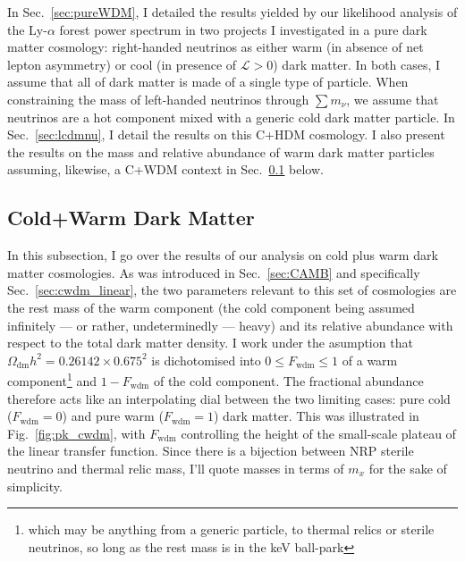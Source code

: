 \vspace*{1.5pc}

In Sec.~\ref{sec:pureWDM}, I detailed the results yielded by our likelihood analysis of the Ly-$\alpha$ forest power spectrum in two projects I investigated in a pure dark matter cosmology: right-handed neutrinos as either warm (in absence of net lepton asymmetry) or cool (in presence of $\mathcal{L}>0$) dark matter. In both cases, I assume that all of dark matter is made of a single type of particle. When constraining the mass of left-handed neutrinos through $\sum m_\nu$, we assume that neutrinos are a hot component mixed with a generic cold dark matter particle. In Sec.~\ref{sec:lcdmnu}, I detail the results on this C+HDM cosmology. I also present the results on the mass and relative abundance of warm dark matter particles assuming, likewise, a C+WDM context in Sec.~\ref{sec:cwdm_flux} below. \\

\subsection{Cold+Warm Dark Matter}
\label{sec:cwdm_flux}

In this subsection, I go over the results of our analysis on cold plus warm dark matter cosmologies. As was introduced in Sec.~\ref{sec:CAMB} and specifically Sec.~\ref{sec:cwdm_linear}, the two parameters relevant to this set of cosmologies are the rest mass of the warm component (the cold component being assumed infinitely --- or rather, undeterminedly --- heavy) and its relative abundance with respect to the total dark matter density. I work under the asumption that $\Omega_{\mathrm{dm}} h^2 = 0.26142 \times 0.675^2$ is dichotomised into $0 \leqslant F_{\mathrm{wdm}} \leqslant 1$ of a warm component\footnote{which may be anything from a generic particle, to thermal relics or sterile neutrinos, so long as the rest mass is in the keV ball-park} and $1 - F_{\mathrm{wdm}}$ of the cold component. The fractional abundance therefore acts like an interpolating dial between the two limiting cases: pure cold ($F_{\mathrm{wdm}} = 0$) and pure warm ($F_{\mathrm{wdm}} = 1$) dark matter. This was illustrated in Fig.~\ref{fig:pk_cwdm}, with $F_{\mathrm{wdm}}$ controlling the height of the small-scale plateau of the linear transfer function. Since there is a bijection between NRP sterile neutrino and thermal relic mass, I'll quote masses in terms of $m_x$ for the sake of simplicity.\\

